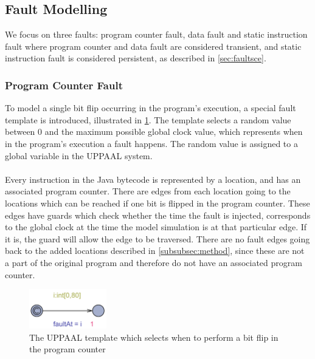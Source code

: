 \subsection{Fault Modelling}
We focus on three faults: program counter fault, data fault and static instruction fault where program counter and data fault are considered transient, and static instruction fault is considered persistent, as described in \cref{sec:faultsce}.

\subsubsection{Program Counter Fault}
To model a single bit flip occurring in the program's execution, a special fault template is introduced, illustrated in \cref{fig:faultTime}. The template selects a random value between $0$ and the maximum possible global clock value, which represents when in the program's execution a fault happens. The random value is assigned to a global variable in the UPPAAL system.\\\\
Every instruction in the Java bytecode is represented by a location, and has an associated program counter. There are edges from each location going to the locations which can be reached if one bit is flipped in the program counter. These edges have guards which check whether the time the fault is injected, corresponds to the global clock at the time the model simulation is at that particular edge. If it is, the guard will allow the edge to be traversed. There are no fault edges going back to the added locations described in \cref{subsubsec:method}, since these are not a part of the original program and therefore do not have an associated program counter.
\begin{figure}[H]
\centering
\includegraphics[width=0.3\textwidth]{figures/faulttemp.PNG}
\caption{The UPPAAL template which selects when to perform a bit flip in the program counter}
\label{fig:faultTime}
\end{figure}

